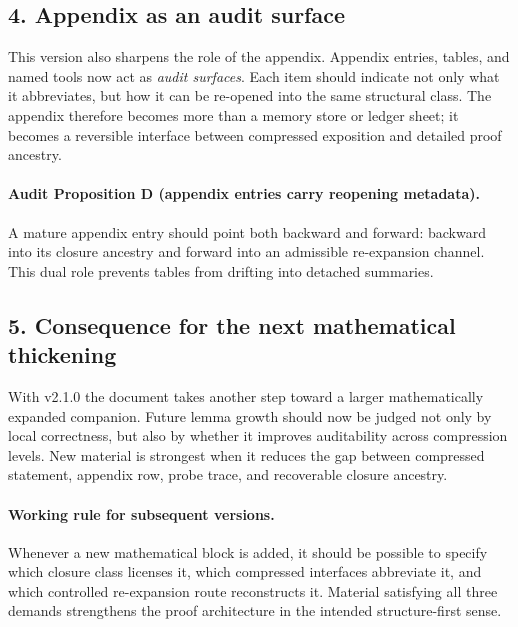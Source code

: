 \subsection*{4. Appendix as an audit surface}
This version also sharpens the role of the appendix. Appendix entries, tables,
and named tools now act as \emph{audit surfaces}. Each item should indicate not
only what it abbreviates, but how it can be re-opened into the same structural
class. The appendix therefore becomes more than a memory store or ledger sheet;
it becomes a reversible interface between compressed exposition and detailed
proof ancestry.

\paragraph{Audit Proposition D (appendix entries carry reopening metadata).}
A mature appendix entry should point both backward and forward: backward into
its closure ancestry and forward into an admissible re-expansion channel. This
dual role prevents tables from drifting into detached summaries.

\subsection*{5. Consequence for the next mathematical thickening}
With v2.1.0 the document takes another step toward a larger mathematically
expanded companion. Future lemma growth should now be judged not only by local
correctness, but also by whether it improves auditability across compression
levels. New material is strongest when it reduces the gap between compressed
statement, appendix row, probe trace, and recoverable closure ancestry.

\paragraph{Working rule for subsequent versions.}
Whenever a new mathematical block is added, it should be possible to specify
which closure class licenses it, which compressed interfaces abbreviate it, and
which controlled re-expansion route reconstructs it. Material satisfying all
three demands strengthens the proof architecture in the intended structure-first
sense.



\clearpage
